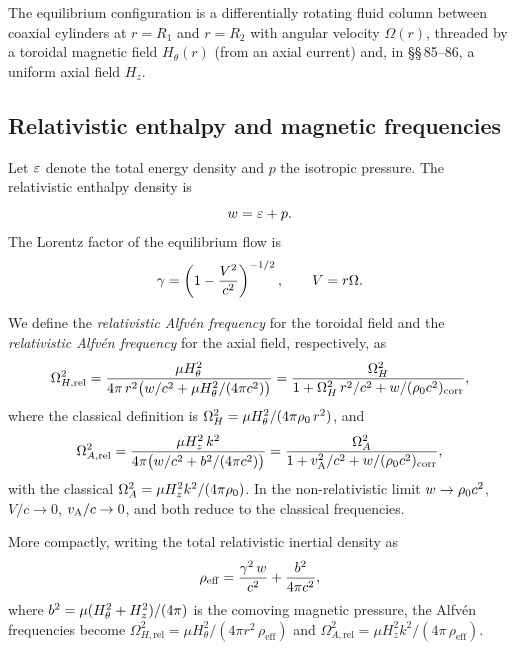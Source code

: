 The equilibrium configuration is a differentially rotating fluid column
between coaxial cylinders at $r = R_1$ and $r = R_2$ with angular
velocity $\Omega(r)$, threaded by a toroidal magnetic field
$H_\theta(r)$ (from an axial current) and, in \S\S\,85--86, a uniform
axial field $H_z$.

\subsection{Relativistic enthalpy and magnetic frequencies}

Let $\varepsilon$ denote the total energy density and $p$ the isotropic
pressure.  The relativistic enthalpy density is
\begin{equation}
  w = \varepsilon + p.
  \label{eq:rel9-w-def}
\end{equation}
The Lorentz factor of the equilibrium flow is
\begin{equation}
  \gamma = \left(1 - \frac{V^2}{c^2}\right)^{-1/2},
  \qquad V = r\Omega.
  \label{eq:rel9-gamma}
\end{equation}

We define the \emph{relativistic Alfv\'en frequency} for the toroidal
field and the \emph{relativistic Alfv\'en frequency} for the axial
field, respectively, as
\begin{equation}
  \Omega_{H,\mathrm{rel}}^{2}
  = \frac{\mu H_\theta^{2}}{4\pi\,r^{2}\bigl(w/c^{2}
    + \mu H_\theta^{2}/(4\pi c^{2})\bigr)}
  = \frac{\Omega_H^{2}}{1 + \Omega_H^{2}\,r^{2}/c^{2}
    + w/(\rho_0 c^{2})_{\mathrm{corr}}},
  \label{eq:rel9-OmH-rel}
\end{equation}
where the classical definition is $\Omega_H^{2}
= \mu H_\theta^{2}/(4\pi\rho_0\,r^{2})$, and
\begin{equation}
  \Omega_{A,\mathrm{rel}}^{2}
  = \frac{\mu H_z^{2}\,k^{2}}{4\pi\bigl(w/c^{2}
    + b^2/(4\pi c^{2})\bigr)}
  = \frac{\Omega_A^{2}}{1 + v_{\mathrm{A}}^{2}/c^{2}
    + w/(\rho_0 c^{2})_{\mathrm{corr}}},
  \label{eq:rel9-OmA-rel}
\end{equation}
with the classical $\Omega_A^{2} = \mu H_z^{2}k^{2}/(4\pi\rho_0)$.
In the non-relativistic limit $w \to \rho_0 c^{2}$,
$V/c \to 0$, $v_{\mathrm{A}}/c \to 0$, and both reduce to the classical
frequencies.

More compactly, writing the total relativistic inertial density as
\begin{equation}
  \rho_{\mathrm{eff}}
  = \frac{\gamma^{2}\,w}{c^{2}}
    + \frac{b^2}{4\pi c^{2}},
  \label{eq:rel9-rhoeff}
\end{equation}
where $b^2 = \mu(H_\theta^{2} + H_z^{2})/(4\pi)$ is the
comoving magnetic pressure, the Alfv\'en frequencies become
$\Omega_{H,\mathrm{rel}}^{2} = \mu H_\theta^{2}/(4\pi r^{2}\,
\rho_{\mathrm{eff}})$ and $\Omega_{A,\mathrm{rel}}^{2} =
\mu H_z^{2}k^{2}/(4\pi\,\rho_{\mathrm{eff}})$.

